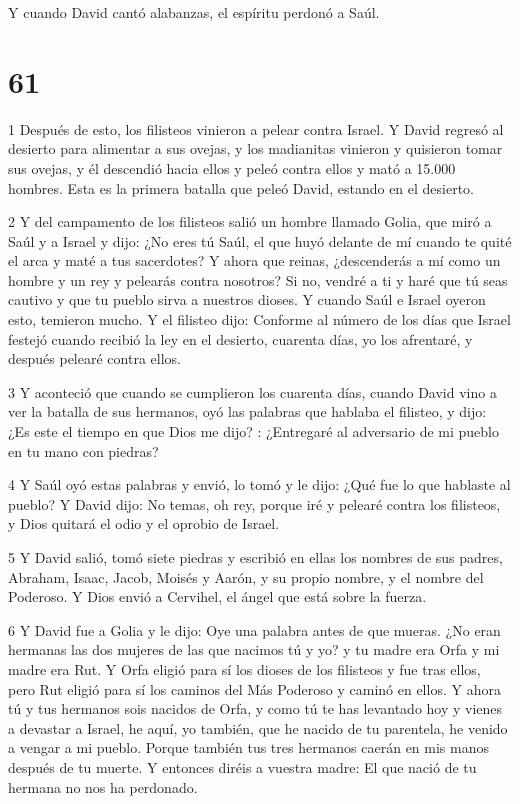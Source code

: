 \par Y cuando David cantó alabanzas, el espíritu perdonó a Saúl.

\chapter{61}

\par 1 Después de esto, los filisteos vinieron a pelear contra Israel. Y David regresó al desierto para alimentar a sus ovejas, y los madianitas vinieron y quisieron tomar sus ovejas, y él descendió hacia ellos y peleó contra ellos y mató a 15.000 hombres. Esta es la primera batalla que peleó David, estando en el desierto.

\par 2 Y del campamento de los filisteos salió un hombre llamado Golia, que miró a Saúl y a Israel y dijo: ¿No eres tú Saúl, el que huyó delante de mí cuando te quité el arca y maté a tus sacerdotes? Y ahora que reinas, ¿descenderás a mí como un hombre y un rey y pelearás contra nosotros? Si no, vendré a ti y haré que tú seas cautivo y que tu pueblo sirva a nuestros dioses. Y cuando Saúl e Israel oyeron esto, temieron mucho. Y el filisteo dijo: Conforme al número de los días que Israel festejó cuando recibió la ley en el desierto, cuarenta días, yo los afrentaré, y después pelearé contra ellos.

\par 3 Y aconteció que cuando se cumplieron los cuarenta días, cuando David vino a ver la batalla de sus hermanos, oyó las palabras que hablaba el filisteo, y dijo: ¿Es este el tiempo en que Dios me dijo? : ¿Entregaré al adversario de mi pueblo en tu mano con piedras?

\par 4 Y Saúl oyó estas palabras y envió, lo tomó y le dijo: ¿Qué fue lo que hablaste al pueblo? Y David dijo: No temas, oh rey, porque iré y pelearé contra los filisteos, y Dios quitará el odio y el oprobio de Israel.

\par 5 Y David salió, tomó siete piedras y escribió en ellas los nombres de sus padres, Abraham, Isaac, Jacob, Moisés y Aarón, y su propio nombre, y el nombre del Poderoso. Y Dios envió a Cervihel, el ángel que está sobre la fuerza.

\par 6 Y David fue a Golia y le dijo: Oye una palabra antes de que mueras. ¿No eran hermanas las dos mujeres de las que nacimos tú y yo? y tu madre era Orfa y mi madre era Rut. Y Orfa eligió para sí los dioses de los filisteos y fue tras ellos, pero Rut eligió para sí los caminos del Más Poderoso y caminó en ellos. Y ahora tú y tus hermanos sois nacidos de Orfa, y como tú te has levantado hoy y vienes a devastar a Israel, he aquí, yo también, que he nacido de tu parentela, he venido a vengar a mi pueblo. Porque también tus tres hermanos caerán en mis manos después de tu muerte. Y entonces diréis a vuestra madre: El que nació de tu hermana no nos ha perdonado.


